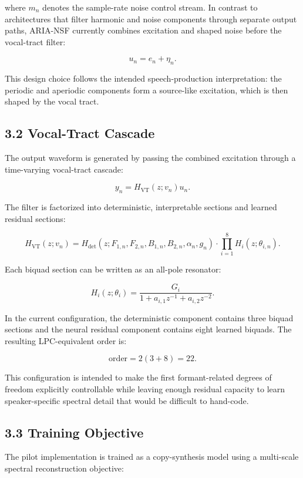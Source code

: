 \documentclass[
  10pt,
]{article}
\begin{document}
where \(m_n\) denotes the sample-rate noise control stream. In contrast
to architectures that filter harmonic and noise components through
separate output paths, ARIA-NSF currently combines excitation and shaped
noise before the vocal-tract filter:

\[
u_n = e_n + \eta_n.
\]

This design choice follows the intended speech-production
interpretation: the periodic and aperiodic components form a source-like
excitation, which is then shaped by the vocal tract.

\subsection{3.2 Vocal-Tract Cascade}\label{vocal-tract-cascade}

The output waveform is generated by passing the combined excitation
through a time-varying vocal-tract cascade:

\[
y_n = H_{\mathrm{VT}}(z; v_n) u_n.
\]

The filter is factorized into deterministic, interpretable sections and
learned residual sections:

\[
H_{\mathrm{VT}}(z; v_n)
=
H_{\mathrm{det}}(z; F_{1,n}, F_{2,n}, B_{1,n}, B_{2,n}, \alpha_n, g_n)
\cdot
\prod_{i=1}^{8} H_i(z; \theta_{i,n}).
\]

Each biquad section can be written as an all-pole resonator:

\[
H_i(z; \theta_i)
=
\frac{G_i}{1+a_{i,1}z^{-1}+a_{i,2}z^{-2}}.
\]

In the current configuration, the deterministic component contains three
biquad sections and the neural residual component contains eight learned
biquads. The resulting LPC-equivalent order is:

\[
\mathrm{order} = 2(3+8)=22.
\]

This configuration is intended to make the first formant-related degrees
of freedom explicitly controllable while leaving enough residual
capacity to learn speaker-specific spectral detail that would be
difficult to hand-code.

\subsection{3.3 Training Objective}\label{training-objective}

The pilot implementation is trained as a copy-synthesis model using a
multi-scale spectral reconstruction objective:
\end{document}
